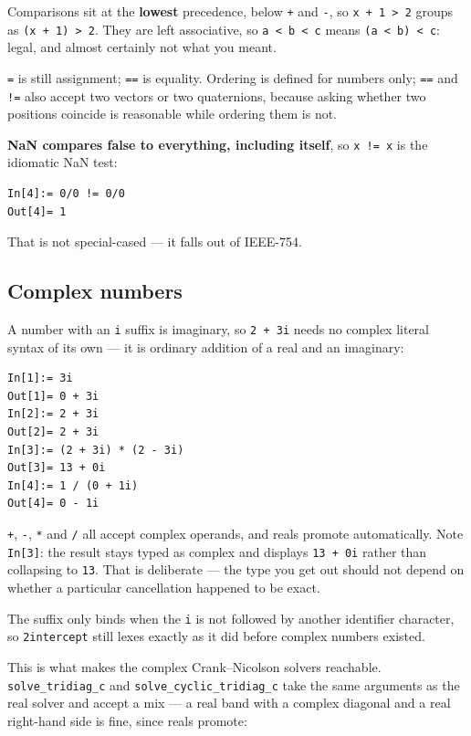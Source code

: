 \documentclass[11pt]{article}
\newcommand{\code}[1]{\texttt{#1}}
\begin{document}
Comparisons sit at the \textbf{lowest} precedence, below \code{+} and
\code{-}, so \code{x + 1 > 2} groups as \code{(x + 1) > 2}. They are
left associative, so \code{a < b < c} means \code{(a < b) < c}: legal,
and almost certainly not what you meant.

\code{=} is still assignment; \code{==} is equality. Ordering is defined
for numbers only; \code{==} and \code{!=} also accept two vectors or two
quaternions, because asking whether two positions coincide is reasonable
while ordering them is not.

\textbf{NaN compares false to everything, including itself}, so
\code{x != x} is the idiomatic NaN test:

\begin{lstlisting}
In[4]:= 0/0 != 0/0
Out[4]= 1
\end{lstlisting}

That is not special-cased --- it falls out of IEEE-754.

\subsection{Complex numbers}\label{sec:complex}

A number with an \code{i} suffix is imaginary, so \code{2 + 3i} needs no
complex literal syntax of its own --- it is ordinary addition of a real
and an imaginary:

\begin{lstlisting}
In[1]:= 3i
Out[1]= 0 + 3i
In[2]:= 2 + 3i
Out[2]= 2 + 3i
In[3]:= (2 + 3i) * (2 - 3i)
Out[3]= 13 + 0i
In[4]:= 1 / (0 + 1i)
Out[4]= 0 - 1i
\end{lstlisting}

\code{+}, \code{-}, \code{*} and \code{/} all accept complex operands,
and reals promote automatically. Note \code{In[3]}: the result stays
typed as complex and displays \code{13 + 0i} rather than collapsing to
\code{13}. That is deliberate --- the type you get out should not depend
on whether a particular cancellation happened to be exact.

The suffix only binds when the \code{i} is not followed by another
identifier character, so \code{2intercept} still lexes exactly as it did
before complex numbers existed.

This is what makes the complex Crank--Nicolson solvers reachable.
\code{solve\_tridiag\_c} and \code{solve\_cyclic\_tridiag\_c} take the
same arguments as the real solver and accept a mix --- a real band with
a complex diagonal and a real right-hand side is fine, since reals
promote:
\end{document}
